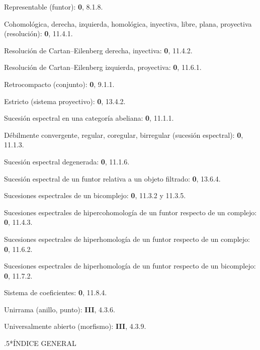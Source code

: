 \documentclass[oneside]{amsart}
\makeatletter
\renewcommand*{\section}{%
  \@startsection{section}{1}{\z@}{.7\linespacing\@plus\linespacing}%
  {.5\linespacing}{\normalfont\bfseries\Large\scshape\centering}}
\newcommand{\oldpage}[2][]{{\marginnote{\normalfont\textbf{#1}~|~#2}}\ignorespaces}
\makeatother
\begin{document}
\begin{flushleft}
Representable (funtor): \textbf 0, 8.1.8.

Cohomológica, derecha, izquierda, homológica, inyectiva, libre, plana, proyectiva
(resolución): \textbf 0, 11.4.1.

Resolución de Cartan--Eilenberg derecha, inyectiva: \textbf 0, 11.4.2.

Resolución de Cartan--Eilenberg izquierda, proyectiva: \textbf 0, 11.6.1.

Retrocompacto (conjunto): \textbf 0, 9.1.1.

Estricto (sistema proyectivo): \textbf 0, 13.4.2.

Sucesión espectral en una categoría abeliana: \textbf 0, 11.1.1.

Débilmente convergente, regular, coregular, birregular (sucesión espectral):
\textbf 0, 11.1.3.

Sucesión espectral degenerada: \textbf 0, 11.1.6.

Sucesión espectral de un funtor relativa a un objeto filtrado: \textbf 0, 13.6.4.

Sucesiones espectrales de un bicomplejo: \textbf 0, 11.3.2 y 11.3.5.

Sucesiones espectrales de hipercohomología de un funtor respecto de un complejo:
\textbf 0, 11.4.3.

Sucesiones espectrales de hiperhomología de un funtor respecto de un complejo:
\textbf 0, 11.6.2.

Sucesiones espectrales de hiperhomología de un funtor respecto de un bicomplejo:
\textbf 0, 11.7.2.

Sistema de coeficientes: \textbf 0, 11.8.4.

Unirrama (anillo, punto): \textbf{III}, 4.3.6.

Universalmente abierto (morfismo): \textbf{III}, 4.3.9.
\end{flushleft}

\clearpage
\oldpage[III]{165}
\section*{ÍNDICE GENERAL}
\end{document}
